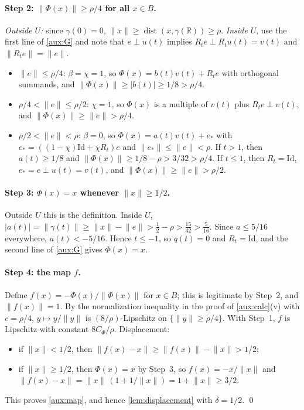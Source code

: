 \documentclass[11pt]{article}
\newcommand{\R}{\mathbb R}
\newcommand{\norm}[1]{\lVert #1\rVert}
\DeclareMathOperator{\dist}{dist}
\theoremstyle{definition}
\numberwithin{equation}{section}
\begin{document}
\paragraph{Step 2: \(\norm{\Phi(x)}\ge\rho/4\) for all \(x\in B\).}
\emph{Outside \(U\):} since \(\gamma(0)=0\),
\(\norm x\ge\dist(x,\gamma(\R))\ge\rho\). \emph{Inside \(U\)}, use the first
line of \eqref{aux:G} and note that \(e\perp u(t)\) implies
\(R_te\perp R_tu(t)=v(t)\) and \(\norm{R_te}=\norm e\).
\begin{itemize}
\item \(\norm e\le\rho/4\): \(\beta=\chi=1\), so
\(\Phi(x)=b(t)v(t)+R_te\) with orthogonal summands, and
\(\norm{\Phi(x)}\ge|b(t)|\ge1/8>\rho/4\).
\item \(\rho/4<\norm e\le\rho/2\): \(\chi=1\), so \(\Phi(x)\) is a multiple
of \(v(t)\) plus \(R_te\perp v(t)\), and
\(\norm{\Phi(x)}\ge\norm e>\rho/4\).
\item \(\rho/2<\norm e<\rho\): \(\beta=0\), so
\(\Phi(x)=a(t)v(t)+e_*\) with
\(e_*=((1-\chi)\mathrm{Id}+\chi R_t)e\) and \(\norm{e_*}\le\norm e<\rho\). If
\(t>1\), then \(a(t)\ge1/8\) and
\(\norm{\Phi(x)}\ge1/8-\rho>3/32>\rho/4\). If \(t\le1\), then
\(R_t=\mathrm{Id}\), \(e_*=e\perp u(t)=v(t)\), and
\(\norm{\Phi(x)}\ge\norm e>\rho/2\).
\end{itemize}

\paragraph{Step 3: \(\Phi(x)=x\) whenever \(\norm x\ge1/2\).}
Outside \(U\) this is the definition. Inside \(U\),
\(|a(t)|=\norm{\gamma(t)}\ge\norm x-\norm e>\frac12-\rho>\frac{15}{32}
>\frac5{16}\). Since \(a\le5/16\) everywhere, \(a(t)<-5/16\). Hence
\(t\le-1\), so \(q(t)=0\) and \(R_t=\mathrm{Id}\), and the second line of
\eqref{aux:G} gives \(\Phi(x)=x\).

\paragraph{Step 4: the map \(f\).}
Define \(f(x)=-\Phi(x)/\norm{\Phi(x)}\) for \(x\in B\); this is legitimate by
Step~2, and \(\norm{f(x)}=1\). By the normalization inequality in the proof
of \cref{aux:calc}(v) with \(c=\rho/4\), \(y\mapsto y/\norm y\) is
\((8/\rho)\)-Lipschitz on \(\{\norm y\ge\rho/4\}\). With Step~1, \(f\) is
Lipschitz with constant \(8C_\Phi/\rho\). Displacement:
\begin{itemize}
\item if \(\norm x<1/2\), then
\(\norm{f(x)-x}\ge\norm{f(x)}-\norm x>1/2\);
\item if \(\norm x\ge1/2\), then \(\Phi(x)=x\) by Step~3, so
\(f(x)=-x/\norm x\) and
\(\norm{f(x)-x}=\norm x\,(1+1/\norm x)=1+\norm x\ge3/2\).
\end{itemize}
This proves \cref{aux:map}, and hence \cref{lem:displacement} with
\(\delta=1/2\). \qed
\end{document}
